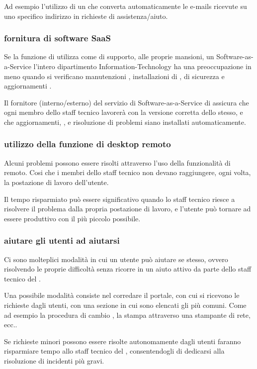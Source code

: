 Ad esempio l'utilizzo di un  che converta automaticamente le e-mails ricevute su uno specifico indirizzo in richieste di assistenza/aiuto.

\subsubsection[Fornitura di software SaaS]{fornitura di software SaaS}
Se la funzione di  utilizza come  di supporto, alle proprie mansioni, un \ac{Software-as-a-Service} l'intero dipartimento \acs{Information-Technology} ha una preoccupazione in meno quando si verificano manutenzioni , installazioni di ,  di sicurezza e aggiornamenti .

Il fornitore (interno/esterno) del servizio di \ac{Software-as-a-Service} di  assicura che ogni membro dello staff tecnico lavorerà con la versione corretta dello stesso, e che aggiornamenti, , e risoluzione di problemi siano installati automaticamente.

\subsubsection[Utilizzo della funzione di desktop remoto]{utilizzo della funzione di desktop remoto}
Alcuni problemi possono essere risolti attraverso l'uso della funzionalità di  remoto. Cosi che i membri dello staff tecnico non devano raggiungere, ogni volta, la postazione di lavoro dell'utente.

Il tempo risparmiato può essere significativo quando lo staff tecnico riesce a risolvere il problema dalla propria postazione di lavoro, e l'utente può tornare ad essere produttivo con il più piccolo  possibile.

\subsubsection[Aiutare gli utenti ad aiutarsi]{aiutare gli utenti ad aiutarsi}
Ci sono molteplici modalità in cui un utente può aiutare se stesso, ovvero risolvendo le proprie difficoltà senza ricorre in un aiuto attivo da parte dello staff tecnico del .

Una possibile modalità consiste nel corredare il portale, con cui si ricevono le richieste dagli utenti, con una sezione in cui sono elencati gli  più comuni. Come ad esempio la procedura di cambio , la stampa attraverso una stampante di rete, ecc..

Se richieste minori possono essere risolte autonomamente dagli utenti faranno risparmiare tempo allo staff tecnico del , consentendogli di dedicarsi alla risoluzione di incidenti più gravi.